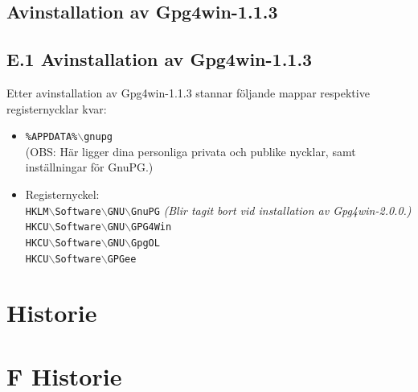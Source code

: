 \documentclass[a4paper,11pt, oneside,openright,titlepage,dvips]{scrbook}
\newcommand{\Filename}[1]{\texttt{#1}}
\newcounter{chapter}
\newcounter{section}[chapter]
\begin{document}
\T\section*{Avinstallation av Gpg4win-1.1.3}
\W\section*{E.1 Avinstallation av Gpg4win-1.1.3}
Etter avinstallation av Gpg4win-1.1.3 stannar följande 
mappar respektive registernycklar kvar:

\begin{itemize}
    \item \Filename{\%APPDATA\%$\backslash$gnupg}\\
        (OBS: Här ligger
	dina personliga privata och publike nycklar, samt inställningar
	för GnuPG.)
    \item Registernyckel:\\
        \Filename{HKLM$\backslash$Software$\backslash$GNU$\backslash$GnuPG}
        \textit{(Blir tagit bort vid installation av Gpg4win-2.0.0.)}\\
        \Filename{HKCU$\backslash$Software$\backslash$GNU$\backslash$GPG4Win}\\
        \Filename{HKCU$\backslash$Software$\backslash$GNU$\backslash$GpgOL} \\
        \Filename{HKCU$\backslash$Software$\backslash$GPGee}


\end{itemize}


\clearpage
{}
\T\chapter{Historie}
\W\chapter*{F Historie}
\end{document}
